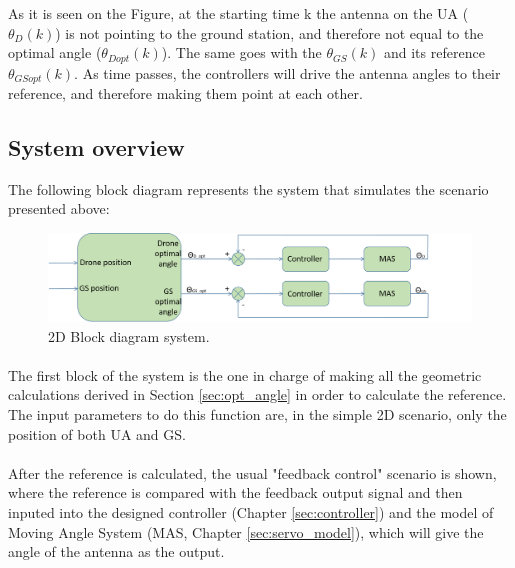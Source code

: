 As it is seen on the Figure, at the starting time k the antenna on the UA ($\theta_{D} (k)$) is not pointing to the ground station, and therefore not equal to the optimal angle ($\theta_{Dopt}(k)$). The same goes with the $\theta_{GS}(k)$ and its reference $\theta_{GSopt}(k)$. As time passes, the controllers will drive the antenna angles to their reference, and therefore making them point at each other. 

\subsection*{System overview}
The following block diagram represents the system that simulates the scenario presented above:
\begin{figure}[H]
	\centering
	\includegraphics[scale=0.50]{figures/2d_system.png}
	\caption{2D Block diagram system.}
	\label{fig:2d_system}
\end{figure}

\paragraph{} The first block of the system is the one in charge of making all the geometric calculations derived in Section \ref{sec:opt_angle} in order to calculate the reference. The input parameters to do this function are, in the simple 2D scenario, only the position of both UA and GS.

\paragraph{} After the reference is calculated, the usual "feedback control" scenario is shown, where the reference is compared with the feedback output signal and then inputed into the designed controller (Chapter \ref{sec:controller}) and the model of Moving Angle System (MAS, Chapter \ref{sec:servo_model}), which will give the angle of the antenna as the output.


